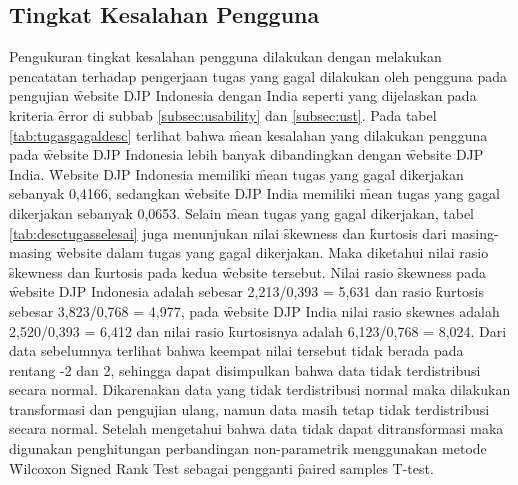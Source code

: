 \subsection{Tingkat Kesalahan Pengguna}
Pengukuran tingkat kesalahan pengguna dilakukan dengan melakukan pencatatan terhadap pengerjaan tugas yang gagal dilakukan oleh pengguna pada pengujian \f{website} DJP Indonesia dengan India seperti yang dijelaskan pada kriteria \f{error} di subbab \ref{subsec:usability} dan \ref{subsec:ust}. Pada tabel \ref{tab:tugasgagaldesc} terlihat bahwa \f{mean} kesalahan yang dilakukan pengguna pada \f{website} DJP Indonesia lebih banyak dibandingkan dengan \f{website} DJP India. \f{Website} DJP Indonesia memiliki \f{mean} tugas yang gagal dikerjakan sebanyak 0,4166, sedangkan \f{website} DJP India memiliki \f{mean} tugas yang gagal dikerjakan sebanyak 0,0653. Selain \f{mean} tugas yang gagal dikerjakan, tabel \ref{tab:desctugasselesai} juga menunjukan nilai \f{skewness} dan \f{kurtosis} dari masing-masing \f{website} dalam tugas yang gagal dikerjakan. Maka diketahui nilai rasio \f{skewness} dan \f{kurtosis} pada kedua \f{website} tersebut. Nilai rasio \f{skewness} pada \f{website} DJP Indonesia adalah sebesar 2,213/0,393 = 5,631 dan rasio \f{kurtosis} sebesar 3,823/0,768 = 4,977, pada \f{website} DJP India nilai rasio skewnes adalah 2,520/0,393 = 6,412 dan nilai rasio \f{kurtosis}nya adalah 6,123/0,768 = 8,024. Dari data sebelumnya terlihat bahwa keempat nilai tersebut tidak berada pada rentang -2 dan 2, sehingga dapat disimpulkan bahwa data tidak terdistribusi secara normal. Dikarenakan data yang tidak terdistribusi normal maka dilakukan transformasi dan pengujian ulang, namun data masih tetap tidak terdistribusi secara normal. Setelah mengetahui bahwa data tidak dapat ditransformasi maka digunakan penghitungan perbandingan non-parametrik menggunakan metode \f{Wilcoxon Signed Rank Test} sebagai pengganti \f{paired samples T-test}.
